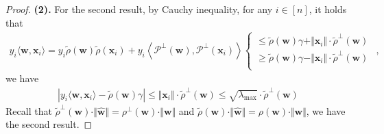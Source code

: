 \documentclass[pdflatex,sn-basic]{sn-jnl}%
\theoremstyle{thmstyleone}%
\begin{document}
\begin{appendices}
\begin{proof}
  \noindent \textbf{(2).}
  For the second result, by Cauchy inequality, for any $i \in [n]$, it holds that 
  \begin{equation*}
  \begin{aligned}
    y_i \langle \mathbf{w}, \mathbf{x}_i \rangle 
    = 
    y_i 
    {\tilde{\rho}}(\mathbf{w}) {\tilde{\rho}}(\mathbf{x}_i)
    + 
    y_i
    \left\langle \mathcal{P}^{\perp}(\mathbf{w}), \mathcal{P}^{\perp}(\mathbf{x}_i) \right\rangle
    \left\{ \begin{array}{cl}
      \le {\tilde{\rho}}(\mathbf{w}) \gamma + \Vert \mathbf{x}_i \Vert  \cdot {\tilde{\rho}}^{\perp} (\mathbf{w}) \\
      \ge {\tilde{\rho}}(\mathbf{w}) \gamma - \Vert \mathbf{x}_i \Vert  \cdot {\tilde{\rho}}^{\perp} (\mathbf{w}) \\
    \end{array} \right.
  \end{aligned},
  \end{equation*}
  we have 
  \begin{equation*}
  \begin{aligned}
    \left| y_i \langle \mathbf{w}, \mathbf{x}_i \rangle  - {\tilde{\rho}}(\mathbf{w}) \gamma\right|
    \le 
    \Vert \mathbf{x}_i \Vert  \cdot {\tilde{\rho}}^{\perp} (\mathbf{w})
    \le 
    \sqrt{\lambda_{\max}}  \cdot {\tilde{\rho}}^{\perp} (\mathbf{w})
  \end{aligned}
  \end{equation*}
  Recall that 
  $\tilde{\rho}^{\perp} \left(\mathbf{w}\right) \cdot \Vert \hat{\mathbf{w}} \Vert 
  = \rho^{\perp} \left(\mathbf{w}\right) \cdot \Vert \mathbf{w} \Vert$ and 
  $\tilde{\rho} \left(\mathbf{w}\right) \cdot \Vert \hat{\mathbf{w}} \Vert 
  = \rho \left(\mathbf{w}\right) \cdot \Vert \mathbf{w} \Vert$, we have the second result.
\end{proof}



\end{appendices}
\end{document}
